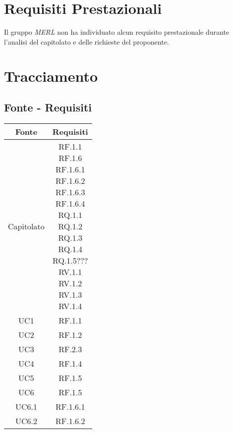 \section{Requisiti Prestazionali}
Il gruppo \textit{MERL} non ha individuato alcun requisito prestazionale durante l'analisi del capitolato e delle richieste del proponente.


\section{Tracciamento}

\subsection{Fonte - Requisiti}
\begin{table}[H]
  \centering
  \begin{tabular}{|c|c|}
    \hline
    \rowcolor[HTML]{036400}
    {\color[HTML]{FFFFFF} Fonte} & {\color[HTML]{FFFFFF} Requisiti} \\ \hline
    \rowcolor[HTML]{EFEFEF}
    Capitolato & \req{RF.1.1 \\ RF.1.6 \\ RF.1.6.1 \\ RF.1.6.2 \\ RF.1.6.3 \\ RF.1.6.4 \\ RQ.1.1 \\ RQ.1.2 \\ RQ.1.3 \\ RQ.1.4 \\ RQ.1.5??? \\ RV.1.1 \\ RV.1.2 \\ RV.1.3 \\ RV.1.4} \\ \hline
    \rowcolor[HTML]{C0C0C0}
    UC1 & RF.1.1 \\ \hline
    \rowcolor[HTML]{EFEFEF}
    UC2 & RF.1.2 \\ \hline
    \rowcolor[HTML]{C0C0C0}
    UC3 & RF.2.3 \\ \hline
    \rowcolor[HTML]{EFEFEF}
    UC4 & RF.1.4 \\ \hline
    \rowcolor[HTML]{C0C0C0}
    UC5 & RF.1.5 \\ \hline
    \rowcolor[HTML]{EFEFEF}
    UC6 & RF.1.5 \\ \hline
    \rowcolor[HTML]{C0C0C0}
    UC6.1 & RF.1.6.1 \\ \hline
    \rowcolor[HTML]{EFEFEF}
    UC6.2 & RF.1.6.2 \\ \hline

\end{tabular}
\end{table}
